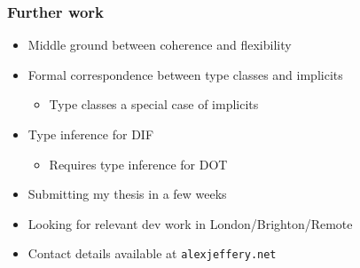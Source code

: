 \begin{frame}
    \frametitle{Further work}
    \begin{itemize}
        \pause \item Middle ground between coherence and flexibility
        \pause \item Formal correspondence between type classes and implicits
        \begin{itemize}
            \pause \item Type classes a special case of implicits
        \end{itemize}
        \pause \item Type inference for DIF
        \begin{itemize}
            \pause \item Requires type inference for DOT
        \end{itemize}
    \end{itemize}
\end{frame}

\begin{frame}
    \begin{itemize}
        \item Submitting my thesis in a few weeks
        \item Looking for relevant dev work in London/Brighton/Remote
        \item Contact details available at \texttt{alexjeffery.net}
    \end{itemize}
\end{frame}
